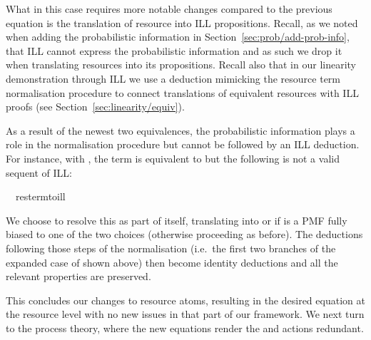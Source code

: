 \documentclass[class=smolathesis,crop=false]{standalone}
\begin{document}
What in this case requires more notable changes compared to the previous equation is the translation of resource into ILL propositions.
Recall, as we noted when adding the probabilistic information in Section~\ref{sec:prob/add-prob-info}, that ILL cannot express the probabilistic information and as such we drop it when translating resources into its propositions.
Recall also that in our linearity demonstration through ILL we use a deduction mimicking the resource term normalisation procedure to connect translations of equivalent resources with ILL proofs (see Section~\ref{sec:linearity/equiv}).

As a result of the newest two equivalences, the probabilistic information plays a role in the normalisation procedure but cannot be followed by an ILL deduction.
For instance, with , the term  is equivalent to  but the following is not a valid sequent of ILL:
\begin{changebar}
\begin{isabelle}
  \centering
  \ \isamath{\nvdash}\ res{\isacharunderscore}term{\isacharunderscore}to{\isacharunderscore}ill\ 
\end{isabelle}
\end{changebar}

We choose to resolve this as part of  itself, translating  into  or  if  is a PMF fully biased to one of the two choices (otherwise proceeding as before).
The deductions following those steps of the normalisation (i.e.\ the first two branches of the expanded  case of  shown above) then become identity deductions and all the relevant properties are preserved.

This concludes our changes to resource atoms, resulting in the desired equation at the resource level with no new issues in that part of our framework.
We next turn to the process theory, where the new equations render the  and  actions redundant.
\end{document}
